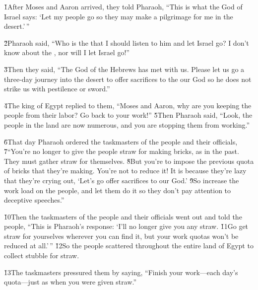 \v{1}After Moses and Aaron arrived, they told Pharaoh, ``This is what the  God of Israel says: `Let my people go so they may make a pilgrimage for me in the desert.'\,''

\v{2}Pharaoh said, ``Who is the  that I should listen to him and let Israel go? I don't know about the , nor will I let Israel go!''

\v{3}Then they said, ``The God of the Hebrews has met with us. Please let us go a three-day journey into the desert to offer sacrifices to the  our God so he does not strike us with pestilence or sword.''

\v{4}The king of Egypt replied to them, ``Moses and Aaron, why are you keeping the people from their labor? Go back to your work!'' \v{5}Then Pharaoh said, ``Look, the people in the land are now numerous, and you are stopping them from working.''

\v{6}That day Pharaoh ordered the taskmasters of the people and their officials, \v{7}``You're no longer to give the people straw for making bricks, as in the past. They must gather straw for themselves. \v{8}But you're to impose the previous quota of bricks that they're making. You're not to reduce it! It is because they're lazy that they're crying out, `Let's go offer sacrifices to our God.' \v{9}So increase the work load on the people, and let them do it so they don't pay attention to deceptive speeches.''

\v{10}Then the taskmasters of the people and their officials went out and told the people, ``This is Pharaoh's response: `I'll no longer give you any straw. \v{11}Go get straw for yourselves wherever you can find it, but your work quotas won't be reduced at all.'\,'' \v{12}So the people scattered throughout the entire land of Egypt to collect stubble for straw.

\v{13}The taskmasters pressured them by saying, ``Finish your work---each day's quota---just as when you were given straw.''

